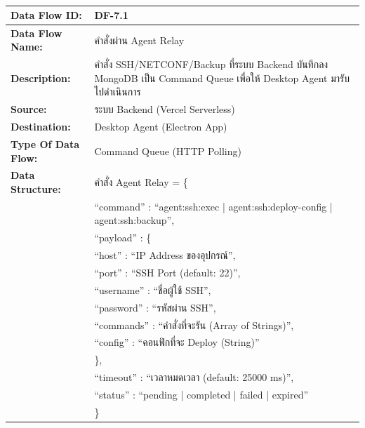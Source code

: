 \begin{table}[H]
    \caption{}
    \label{tab:df-7-1}
    \fontSixTeen 
    \begin{tabularx}{\textwidth}{|l|L|} 
        \hline
        \textbf{Data Flow ID:} & DF-7.1 \\
        \hline
        \textbf{Data Flow Name:} & คำสั่งผ่าน Agent Relay \\
        \hline
        \textbf{Description:} & คำสั่ง SSH/NETCONF/Backup ที่ระบบ Backend บันทึกลง MongoDB เป็น Command Queue เพื่อให้ Desktop Agent มารับไปดำเนินการ \\
        \hline
        \textbf{Source:} & ระบบ Backend (Vercel Serverless) \\
        \hline
        \textbf{Destination:} & Desktop Agent (Electron App) \\
        \hline
        \textbf{Type Of Data Flow:} & Command Queue (HTTP Polling) \\
        \hline
        \textbf{Data Structure:} & คำสั่ง Agent Relay = \{ \nonumber \\
                        & \hspace{1em} ``command'' : ``agent:ssh:exec | agent:ssh:deploy-config | agent:ssh:backup'', \nonumber \\
                        & \hspace{1em} ``payload'' : \{ \nonumber \\
                        & \hspace{2em} ``host'' : ``IP Address ของอุปกรณ์'', \nonumber \\
                        & \hspace{2em} ``port'' : ``SSH Port (default: 22)'', \nonumber \\
                        & \hspace{2em} ``username'' : ``ชื่อผู้ใช้ SSH'', \nonumber \\
                        & \hspace{2em} ``password'' : ``รหัสผ่าน SSH'', \nonumber \\
                        & \hspace{2em} ``commands'' : ``คำสั่งที่จะรัน (Array of Strings)'', \nonumber \\
                        & \hspace{2em} ``config'' : ``คอนฟิกที่จะ Deploy (String)'' \nonumber \\
                        & \hspace{1em} \}, \nonumber \\
                        & \hspace{1em} ``timeout'' : ``เวลาหมดเวลา (default: 25000 ms)'', \nonumber \\
                        & \hspace{1em} ``status'' : ``pending | completed | failed | expired'' \nonumber \\
                        & \} \\
        \hline
    \end{tabularx}
\end{table}

